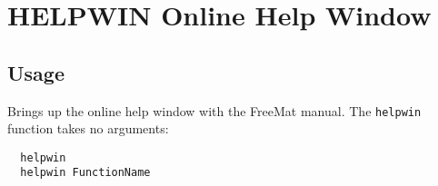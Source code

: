 \section{HELPWIN Online Help Window}

\subsection{Usage}

Brings up the online help window with the FreeMat manual.  The
\verb|helpwin| function takes no arguments:
\begin{verbatim}
  helpwin
  helpwin FunctionName
\end{verbatim}
